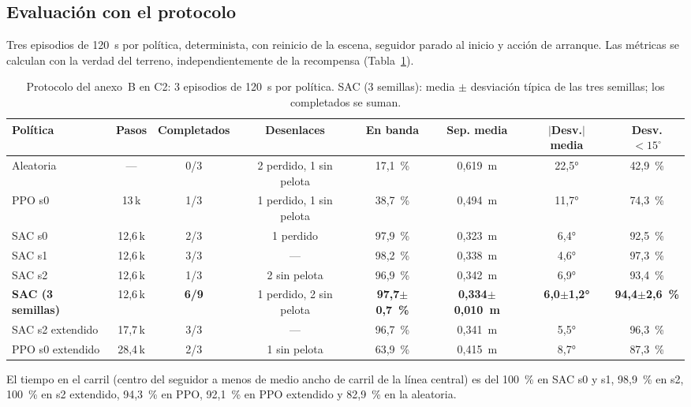 \documentclass[11pt,a4paper]{article}
\begin{document}
\subsection{Evaluación con el protocolo}
Tres episodios de 120~s por política, determinista, con reinicio de la escena, seguidor parado al inicio y
acción de arranque. Las métricas se calculan con la verdad del terreno, independientemente de la recompensa
(Tabla~\ref{tab:evalC2}).

\begin{table}[h]
\centering\small
\caption{Protocolo del anexo~B en C2: 3 episodios de 120~s por política. SAC (3 semillas): media $\pm$ desviación
típica de las tres semillas; los completados se suman.}
\label{tab:evalC2}
\setlength{\tabcolsep}{4pt}
\begin{tabular}{@{}lccccccc@{}}
\toprule
Política & Pasos & Completados & Desenlaces & En banda & Sep. media & $|$Desv.$|$ media & Desv. $<15^{\circ}$ \\
\midrule
Aleatoria & --- & 0/3 & 2 perdido, 1 sin pelota & 17,1~\% & 0,619~m & 22,5° & 42,9~\% \\
PPO s0 & 13\,k & 1/3 & 1 perdido, 1 sin pelota & 38,7~\% & 0,494~m & 11,7° & 74,3~\% \\
SAC s0 & 12,6\,k & 2/3 & 1 perdido & 97,9~\% & 0,323~m & 6,4° & 92,5~\% \\
SAC s1 & 12,6\,k & 3/3 & --- & 98,2~\% & 0,338~m & 4,6° & 97,3~\% \\
SAC s2 & 12,6\,k & 1/3 & 2 sin pelota & 96,9~\% & 0,342~m & 6,9° & 93,4~\% \\
\textbf{SAC (3 semillas)} & 12,6\,k & \textbf{6/9} & 1 perdido, 2 sin pelota & \textbf{97,7$\pm$0,7~\%} &
\textbf{0,334$\pm$0,010~m} & \textbf{6,0$\pm$1,2°} & \textbf{94,4$\pm$2,6~\%} \\
\midrule
SAC s2 extendido & 17,7\,k & 3/3 & --- & 96,7~\% & 0,341~m & 5,5° & 96,3~\% \\
PPO s0 extendido & 28,4\,k & 2/3 & 1 sin pelota & 63,9~\% & 0,415~m & 8,7° & 87,3~\% \\
\bottomrule
\end{tabular}
\end{table}

El tiempo en el carril (centro del seguidor a menos de medio ancho de carril de la línea central) es del 100~\%
en SAC s0 y s1, 98,9~\% en s2, 100~\% en s2 extendido, 94,3~\% en PPO, 92,1~\% en PPO extendido y 82,9~\% en la
aleatoria.
\end{document}
